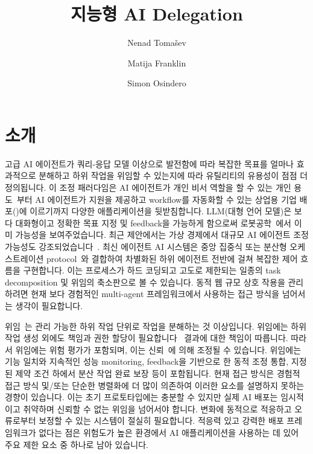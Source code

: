 \documentclass[11pt, a4paper, twocolumn, copyright, goog]{google}
\title{지능형 AI Delegation}
\author[1]{Nenad Toma\v{s}ev}
\author[1]{Matija Franklin}
\author[1]{Simon Osindero}
\affil[1]{Google DeepMind}
\begin{document}
\maketitle

\section{소개}

고급 AI 에이전트가 쿼리-응답 모델 이상으로 발전함에 따라 복잡한 목표를 얼마나 효과적으로 분해하고 하위 작업을 위임할 수 있는지에 따라 유틸리티의 유용성이 점점 더 정의됩니다. 이 조정 패러다임은 AI 에이전트가 개인 비서 역할을 할 수 있는 개인 용도~\citep{gabriel2024ethics}부터 AI 에이전트가 지원을 제공하고 workflow를 자동화할 수 있는 상업용 기업 배포(\citep{shao2025futureworkaiagents, huang2025deploying, tupe2025aiagenticworkflowsenterprise})에 이르기까지 다양한 애플리케이션을 뒷받침합니다. LLM(대형 언어 모델)은 보다 대화형이고 정확한 목표 지정 및 feedback을 가능하게 함으로써 로봇공학~\citep{wang2024largelanguagemodelsrobotics, li2025largelanguagemodelsmultirobot}에서 이미 가능성을 보여주었습니다. 최근 제안에서는 가상 경제에서 대규모 AI 에이전트 조정 가능성도 강조되었습니다~\citep{tomasev2025virtualagenteconomies}. 최신 에이전트 AI 시스템은 중앙 집중식 또는 분산형 오케스트레이션 protocol~\citep{hong2023metagpt, rasal2024navigatingcomplexityorchestratedproblem, zhang2025agentorchestra, song2025gradientsysmultiagentllmscheduler}와 결합하여 차별화된 하위 에이전트 전반에 걸쳐 복잡한 제어 흐름을 구현합니다. 이는 프로세스가 하드 코딩되고 고도로 제한되는 일종의 task decomposition 및 위임의 축소판으로 볼 수 있습니다. 동적 웹 규모 상호 작용을 관리하려면 현재 보다 경험적인 multi-agent 프레임워크에서 사용하는 접근 방식을 넘어서는 생각이 필요합니다.

위임~\citep{castelfranchi1998towards}는 관리 가능한 하위 작업 단위로 작업을 분해하는 것 이상입니다. 위임에는 하위 작업 생성 외에도 책임과 권한 할당이 필요합니다~\citep{mueller2013effective, nagia2024delegation} 결과에 대한 책임이 따릅니다. 따라서 위임에는 위험 평가가 포함되며, 이는 신뢰~\citep{griffiths2005task}에 의해 조정될 수 있습니다. 위임에는 기능 일치와 지속적인 성능 monitoring, feedback을 기반으로 한 동적 조정 통합, 지정된 제약 조건 하에서 분산 작업 완료 보장 등이 포함됩니다. 현재 접근 방식은 경험적 접근 방식 및/또는 단순한 병렬화에 더 많이 의존하여 이러한 요소를 설명하지 못하는 경향이 있습니다. 이는 초기 프로토타입에는 충분할 수 있지만 실제 AI 배포는 임시적이고 취약하며 신뢰할 수 없는 위임을 넘어서야 합니다. \citep{hauptman2023adapt, acharya2025agentic} 변화에 동적으로 적응하고 오류로부터 보정할 수 있는 시스템이 절실히 필요합니다. 적응력 있고 강력한 배포 프레임워크가 없다는 점은 위험도가 높은 환경에서 AI 애플리케이션을 사용하는 데 있어 주요 제한 요소 중 하나로 남아 있습니다.
\end{document}
